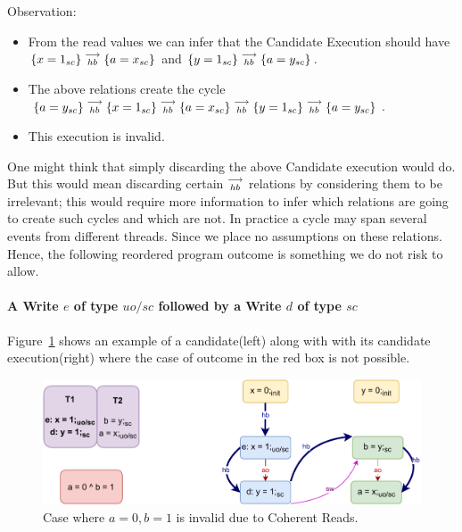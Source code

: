         Observation:
        \begin{itemize}
            \item From the read values we can infer that the Candidate Execution should have $\{x=1_{sc}\}\stackrel{\longrightarrow}{_{hb}}\{a=x_{sc}\}$ and $\{y=1_{sc}\}\stackrel{\longrightarrow}{_{hb}}\{a=y_{sc}\}$.
            \item The above relations create the cycle $\{a=y_{sc}\}\stackrel{\longrightarrow}{_{hb}}\{x=1_{sc}\}\stackrel{\longrightarrow}{_{hb}}\{a=x_{sc}\}\stackrel{\longrightarrow}{_{hb}}\{y=1_{sc}\}\stackrel{\longrightarrow}{_{hb}}\{a=y_{sc}\}$.
            \item This execution is invalid. 
        \end{itemize}

        One might think that simply discarding the above Candidate execution would do. 
        But this would mean discarding certain $\stackrel{\longrightarrow}{_{hb}}$ relations by considering them to be irrelevant; this would require more information to infer which relations are going to create such cycles and which are not. 
        In practice a cycle may span several events from different threads.
        Since we place no assumptions on these relations.
        Hence, the following reordered program outcome is something we do not risk to allow.


    \paragraph{A Write $e$ of type $uo/sc$ followed by a Write $d$ of type $sc$}
        
        Figure~\ref{reord_counter:example4(a)} shows an example of a candidate(left) along with with its candidate execution(right) where the case of outcome in the red box is not possible. 
        \begin{figure}[H]
            \centering
            \includegraphics[scale=0.7]{7.CounterExamples/ReorderingCandidate/Example7(Wuo,sc-Wsc).pdf}
            \caption{Case where $a = 0, b = 1$ is invalid due to Coherent Reads.}
            \label{reord_counter:example4(a)}
        \end{figure}
        
